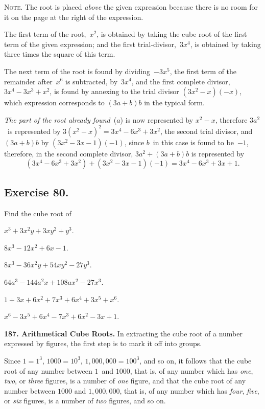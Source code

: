 \documentclass[12pt]{book}[2005/09/16]
\newcommand{\Require}[1][2\baselineskip]{%
  \setlength{\TmpLen}{\pagegoal-\pagetotal}%
  \ifthenelse{\lengthtest{0pt < \TmpLen}\and\lengthtest{\TmpLen < #1}}{%
    \vfil\newpage%
  }{}%
}
\newcommand{\ScreenBreak}{\ifthenelse{\not\boolean{ForPrinting}}{\newpage}{}}
\newcommand{\Paragraph}[1]{\medskip\par\textbf{#1}}
\newcommand{\Exercise}[2][]{%
  \Require[3\baselineskip]
  \subsection*{\centering\small Exercise #2}
  \ifthenelse{\not\equal{#1}{}}{%
    \subsubsection*{\centering\normalfont\small\scshape #1}
  }{}
  \phantomsection\label{exer:#2}%
}
\newenvironment{Remark}[1][]{\par\small\textsc{#1}}{\par}
\newcommand{\Item}[1]{\vspace{4pt plus 16pt}\makebox[1em][r]{\textbf{#1}\ }}
\newcommand{\DPtypo}[2]{#2}
\newcommand{\Add}[1]{\DPtypo{}{#1}}
\newlength{\TmpLen}
\begin{document}
\begin{Remark}[Note.] The root is placed \emph{above} the given expression because
there is no room for it on the page at the right of the expression.

The first term of the root,~$x^{2}$, is obtained by taking the cube root
of the first term of the given expression; and the first trial-divisor,~$3x^{4}$,
is obtained by taking three times the square of this term.

The next term of the root is found by dividing~$-3x^{5}$, the first term
of the remainder after~$x^{6}$ is subtracted, by~$3x^{4}$, and the first complete
divisor, $3x^{4} - 3x^{3} + x^{2}$, is found by annexing to the trial divisor
$(3x^{2} - x)(-x)$, which expression corresponds to $(3a + b)b$ in the
typical form.

\emph{The part of the root already found}~($a$) is now represented by $x^{2} - x$,
therefore $3a^{2}$~is represented by $3(x^{2} - x)^{2} = 3x^{4} - 6x^{3} + 3x^{2}$, the
second trial divisor\Add{,} and $(3a + b)b$ by $(3x^{2} - 3x - 1)(-1)$, since $b$~in
this case is found to be~$-1$, therefore, in the second complete
divisor, $3a^{2} + (3a + b)b$ is represented by
\[
(3x^{4} - 6x^{3} + 3x^{2}) + (3x^{2} - 3x - 1)(-1) = 3x^{4} - 6x^{3} + 3x + 1.
\]
\end{Remark}

\Exercise{80.}

Find the cube root of

\Item{1.}  $x^{3} + 3x^{2} y + 3xy^{2} + y^{3}$\Add{.}

\Item{2.}  $8x^{3} - 12x^{2} + 6x - 1$.

\Item{3.}  $8x^{3} - 36x^{2} y + 54xy^{2} - 27y^{3}$.

\Item{4.}  $64a^{3} - 144a^{2} x + 108ax^{2} - 27x^{3}$\Add{.}

\Item{5.}  $1 + 3x + 6x^{2} + 7x^{3} + 6x^{4} + 3x^{5} + x^{6}$.

\Item{6.}  $x^{6} - 3x^{5} + 6x^{4} - 7x^{3} + 6x^{2} - 3x + 1$.

\ScreenBreak
\Paragraph{187.  Arithmetical Cube Roots.}  In extracting the cube root
of a number expressed by figures, the first step is to mark
it off into groups\Add{.}

Since $1 = 1^{3}$, $1000 = 10^{3}$, $1,000,000 = 100^{3}$, and so on, it
follows that the cube root of any number between $1$~and
$1000$, that is, of any number which has \emph{one}, \emph{two}, or \emph{three}
figures, is a number of \emph{one} figure, and that the cube root
of any number between $1000$ and $1,000,000$, that is, of any
number which has \emph{four}, \emph{five}, or \emph{six} figures, is a number of
\emph{two} figures, and so on.
\end{document}
